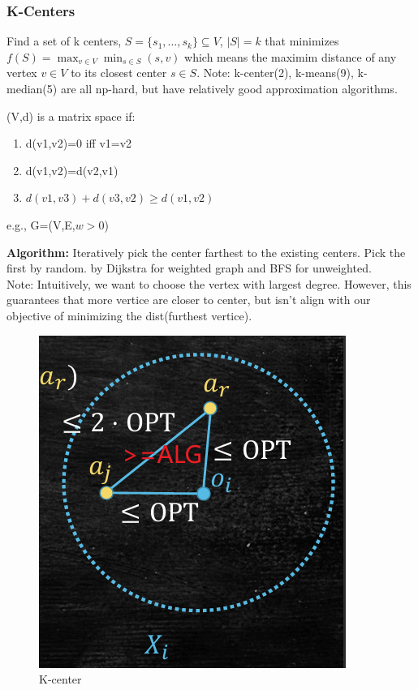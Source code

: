 \subsubsection{K-Centers}
Find a set of k centers, $S=\{s_1,\ldots ,s_k\} \subseteq V$, $|S|=k$ that minimizes $f(S)=\max_{v \in V} \min_{s \in S} (s,v)$ which means the maximim distance of any vertex $v \in V$ to its closest center $s\in S$.
Note: k-center(2), k-means(9), k-median(5) are all np-hard, but have relatively good approximation algorithms.
\begin{remark}
    (V,d) is a matrix space if:
    \begin{enumerate}
        \item d(v1,v2)=0 iff v1=v2
        \item d(v1,v2)=d(v2,v1)
        \item $d(v1,v3)+d(v3,v2)\geq d(v1,v2)$
    \end{enumerate}
    e.g., G=(V,E,$w>0$)
\end{remark}
\textbf{Algorithm:} Iteratively pick the center farthest to the existing centers. Pick the first by random. by Dijkstra for weighted graph and BFS for unweighted.\\
Note: Intuitively, we want to choose the vertex with largest degree. However, this guarantees that more vertice are closer to center,
but isn't align with our objective of minimizing the dist(furthest vertice).\\
\begin{figure}
    \centering
    \includegraphics[width=0.6\linewidth]{Notes/fig/k-center.png}
    \caption{K-center}
    \label{fig:kcenter}
\end{figure}

